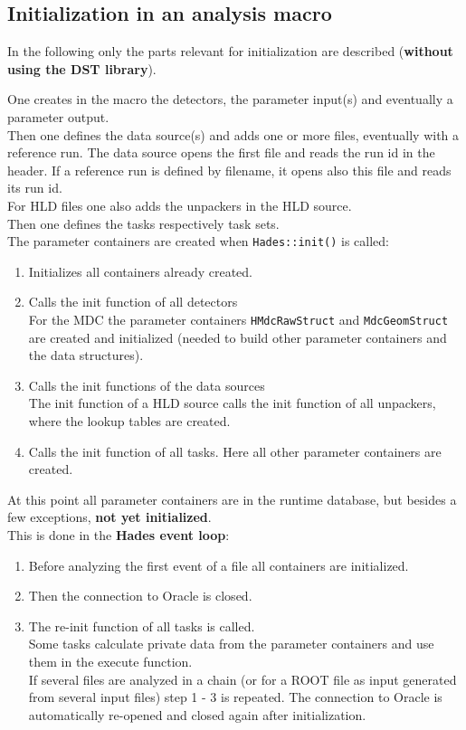 \subsection{Initialization in an analysis macro}

In the following only the parts relevant for initialization are described (\textbf{without using the DST library}).

One creates in the macro the detectors, the parameter input(s) and eventually a parameter output.\\
Then one defines the data source(s) and adds one or more files, eventually with a reference run. The data source opens 
the first file and reads the run id in the header. If a reference run is defined by filename, it opens also this file 
and reads its run id.\\
For HLD files one also adds the unpackers in the HLD source.\\
Then one defines the tasks respectively task sets.\\

The parameter containers are created when \verb+Hades::init()+ is called:
\begin{enumerate}
  \setlength{\itemsep}{0pt}    
  \item Initializes all containers already created.
  \item Calls the init function of all detectors\\
        For the MDC the parameter containers \verb+HMdcRawStruct+ and \verb+MdcGeomStruct+ are created and initialized 
        (needed to build other parameter containers and the data structures).
  \item Calls the init functions of the data sources\\
        The init function of a HLD source calls the init function of all unpackers, where the lookup tables are created.
  \item Calls the init function of all tasks. Here all other parameter containers are created.
\end{enumerate}

At this point all parameter containers are in the runtime database, but besides a few exceptions, 
\textbf{not yet initialized}.\\
This is done in the \textbf{Hades event loop}:
\begin{enumerate}
  \setlength{\itemsep}{0pt}    
  \item Before analyzing the first event of a file all containers are initialized.
  \item Then the connection to Oracle is closed.
  \item The re-init function of all tasks is called.\\
        Some tasks calculate private data from the parameter containers and use them in the execute function.\\
        If several files are analyzed in a chain (or for a ROOT file as input generated from several input files) step 
        1 - 3 is repeated. The connection to Oracle is automatically re-opened and closed again after initialization.
\end{enumerate}

